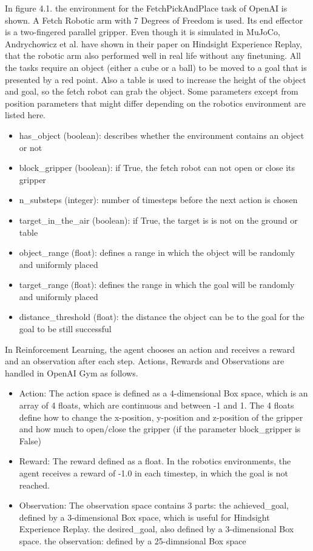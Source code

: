 In figure 4.1. the environment for the FetchPickAndPlace task of OpenAI is shown. A Fetch Robotic arm with 7 Degrees of Freedom is used. Its end effector is a two-fingered parallel gripper. Even though it is simulated in MuJoCo, Andrychowicz et al. have shown in their paper on Hindsight Experience Replay, that the robotic arm also performed well in real life without any finetuning. 
All the tasks require an object (either a cube or a ball) to be moved to a goal that is presented by a red point. Also a table is used to increase the height of the object and goal, so the fetch robot can grab the object.
Some parameters except from position parameters that might differ depending on the robotics environment are listed here.

\begin{itemize}
	\item has\_object (boolean): describes whether the environment contains an object or not
	\item block\_gripper (boolean): if True, the fetch robot can not open or close its gripper
	\item n\_substeps (integer): number of timesteps before the next action is chosen
	\item target\_in\_the\_air (boolean): if True, the target is is not on the ground or table 
	\item object\_range (float): defines a range in which the object will be randomly and uniformly placed
	\item target\_range (float): defines the range in which the goal will be randomly and uniformly placed
	\item distance\_threshold (float): the distance the object can be to the goal for the goal to be still successful 
\end{itemize}

In Reinforcement Learning, the agent chooses an action and receives a reward and an observation after each step. Actions, Rewards and Observations are handled in OpenAI Gym as follows.

\begin{itemize}
	\item Action: The action space is defined as a 4-dimensional Box space, which is an array of 4 floats, which are continuous and between -1 and 1. The 4 floats define how to change the x-position, y-position and z-position of the gripper and how much to open/close the gripper (if the parameter block\_gripper is False)
	\item Reward: The reward defined as a float. In the robotics environments, the agent receives a reward of -1.0 in each timestep, in which the goal is not reached.
	\item Observation: The observation space contains 3 parts:
	the achieved\_goal, defined by a 3-dimensional Box space, which is useful for Hindsight Experience Replay. 
	the desired\_goal, also defined by a 3-dimensional Box space.
	the observation: defined by a 25-dimnsional Box space
\end{itemize}




